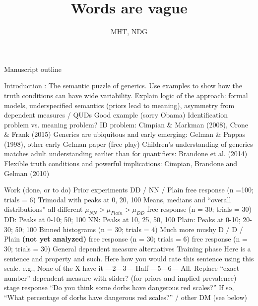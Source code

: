 \documentclass{article}
\begin{document}
\title{Words are vague}
\author{MHT, NDG} \maketitle
 
\begin{outline}
  \0 Manuscript outline
  
  		\1 Introduction : The semantic puzzle of generics. Use examples to show how the truth conditions can have wide variability. Explain logic of the approach: formal models, underspecified semantics (priors lead to meaning), asymmetry from dependent measures / QUDs
			\2 Good example (sorry Obama)
			\2 Identification problem vs. meaning problem? 
				\3 ID problem: Cimpian \& Markman (2008), Crone \& Frank (2015)
			\2 Generics are ubiquitous and early emerging: Gelman \& Pappas (1998), other early Gelman paper (free play)
			\2 Children's understanding of generics matches adult understanding earlier than for quantifiers: Brandone et al. (2014)
			\2 Flexible truth conditions and powerful implications: Cimpian, Brandone and Gelman (2010)
	
\vspace{2cm}
	\0 Work (done, or to do)
		\1 Prior experiments
			\2 DD / NN / Plain
				 free response (n =100; trials = 6)
					\4 Trimodal with peaks at 0, 20, 100
					\4 Means, medians and ``overall distributions'' all different
					\4$ \mu_{NN} > \mu_{Plain} > \mu_{DD} $
				 free response (n = 30; trials = 30)
					\4 DD: Peaks at 0-10; 50; 100
					\4 NN: Peaks at 10, 25, 50, 100
					\4 Plain: Peaks at 0-10; 20-30; 50; 100
				\3 Binned histograms (n = 30; trials = 4)
					\4 Much more mushy
			\2 D / D / Plain \textbf{(not yet analyzed)}
				 free response (n = 30; trials = 6)
				 free response (n = 30; trials = 30)
			\2 General dependent measure alternatives
				\3 Training phase
					\4 Here is a sentence and property and such.
					\4 Here how you would rate this sentence using this scale.
					\4 e.g., None of the X have it ---2---3--- Half ---5---6--- All.
				\3 Replace ``exact number'' dependent measure with slider? (for priors and implied prevalence)
				 stage response
					\4 ``Do you think some dorbs have dangerous red scales?''
					\4 If so, ``What percentage of dorbs have dangerous red scales?'' / other DM (see below)
					

\end{outline}
\end{document}
